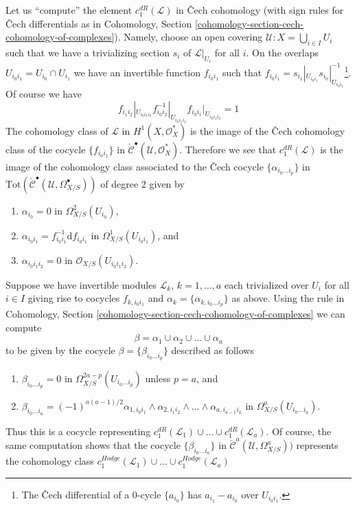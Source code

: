 Let us ``compute'' the element $c^{dR}_1(\mathcal{L})$ in {\v C}ech
cohomology (with sign rules for {\v C}ech differentials
as in Cohomology, Section
\ref{cohomology-section-cech-cohomology-of-complexes}).
Namely, choose an open covering
$\mathcal{U} : X = \bigcup_{i \in I} U_i$ such that
we have a trivializing section $s_i$ of $\mathcal{L}|_{U_i}$ for all $i$.
On the overlaps $U_{i_0i_1} = U_{i_0} \cap U_{i_1}$
we have an invertible function $f_{i_0i_1}$ such that
$f_{i_0i_1} = s_{i_1}|_{U_{i_0i_1}} s_{i_0}|_{U_{i_0i_1}}^{-1}$\footnote{The
{\v C}ech differential of a $0$-cycle $\{a_{i_0}\}$ has
$a_{i_1} - a_{i_0}$ over $U_{i_0i_1}$.}.
Of course we have
$$
f_{i_1i_2}|_{U_{i_0i_1i_2}}
f_{i_0i_2}^{-1}|_{U_{i_0i_1i_2}}
f_{i_0i_1}|_{U_{i_0i_1i_2}} = 1
$$
The cohomology class of $\mathcal{L}$ in $H^1(X, \mathcal{O}_X^*)$ is
the image of the {\v C}ech cohomology class of the cocycle $\{f_{i_0i_1}\}$ in
$\check{\mathcal{C}}^\bullet(\mathcal{U}, \mathcal{O}_X^*)$.
Therefore we see that $c_1^{dR}(\mathcal{L})$ is the image
of the cohomology class associated to the {\v C}ech cocycle
$\{\alpha_{i_0 \ldots i_p}\}$ in
$\text{Tot}(\check{\mathcal{C}}^\bullet(\mathcal{U}, \Omega_{X/S}^\bullet))$
of degree $2$ given by
\begin{enumerate}
\item $\alpha_{i_0} = 0$ in $\Omega^2_{X/S}(U_{i_0})$,
\item $\alpha_{i_0i_1} = f_{i_0i_1}^{-1}\text{d}f_{i_0i_1}$ in
$\Omega^1_{X/S}(U_{i_0i_1})$, and
\item $\alpha_{i_0i_1i_2} = 0$ in $\mathcal{O}_{X/S}(U_{i_0i_1i_2})$.
\end{enumerate}
Suppose we have invertible modules $\mathcal{L}_k$, $k = 1, \ldots, a$
each trivialized over $U_i$ for all $i \in I$ giving rise to cocycles
$f_{k, i_0i_1}$ and $\alpha_k = \{\alpha_{k, i_0 \ldots i_p}\}$ as above.
Using the rule in
Cohomology, Section \ref{cohomology-section-cech-cohomology-of-complexes}
we can compute
$$
\beta = \alpha_1 \cup \alpha_2 \cup \ldots \cup \alpha_a
$$
to be given by the cocycle $\beta = \{\beta_{i_0 \ldots i_p}\}$
described as follows
\begin{enumerate}
\item $\beta_{i_0 \ldots i_p} = 0$ in
$\Omega^{2a - p}_{X/S}(U_{i_0 \ldots i_p})$ unless $p = a$, and
\item $\beta_{i_0 \ldots i_a} = (-1)^{a(a - 1)/2}
\alpha_{1, i_0i_1} \wedge \alpha_{2, i_1 i_2} \wedge \ldots \wedge
\alpha_{a, i_{a - 1}i_a}$ in
$\Omega^a_{X/S}(U_{i_0 \ldots i_a})$.
\end{enumerate}
Thus this is a cocycle representing
$c_1^{dR}(\mathcal{L}_1) \cup \ldots \cup c_1^{dR}(\mathcal{L}_a)$.
Of course, the same computation shows that the cocycle
$\{\beta_{i_0 \ldots i_a}\}$ in
$\check{\mathcal{C}}^a(\mathcal{U}, \Omega_{X/S}^a))$
represents the cohomology class
$c_1^{Hodge}(\mathcal{L}_1) \cup \ldots \cup c_1^{Hodge}(\mathcal{L}_a)$

